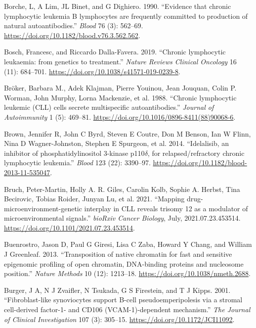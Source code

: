 \documentclass[11pt, a4paper, twosided]{book}
\newenvironment{CSLReferences}%
  {}%
  {\par}
\begin{document}
\begin{CSLReferences}{1}{0}
\leavevmode{}%
Borche, L, A Lim, JL Binet, and G Dighiero. 1990. {``{Evidence that chronic lymphocytic leukemia B lymphocytes are frequently committed to production of natural autoantibodies}.''} \emph{Blood} 76 (3): 562--69. \url{https://doi.org/10.1182/blood.v76.3.562.562}.

\leavevmode{}%
Bosch, Francesc, and Riccardo Dalla-Favera. 2019. {``{Chronic lymphocytic leukaemia: from genetics to treatment}.''} \emph{Nature Reviews Clinical Oncology} 16 (11): 684--701. \url{https://doi.org/10.1038/s41571-019-0239-8}.

\leavevmode{}%
Bröker, Barbara M., Adek Klajman, Pierre Youinou, Jean Jouquan, Colin P. Worman, John Murphy, Lorna Mackenzie, et al. 1988. {``{Chronic lymphocytic leukemic (CLL) cells secrete multispecific autoantibodies}.''} \emph{Journal of Autoimmunity} 1 (5): 469--81. \url{https://doi.org/10.1016/0896-8411(88)90068-6}.

\leavevmode{}%
Brown, Jennifer R, John C Byrd, Steven E Coutre, Don M Benson, Ian W Flinn, Nina D Wagner-Johnston, Stephen E Spurgeon, et al. 2014. {``{Idelalisib, an inhibitor of phosphatidylinositol 3-kinase p110\(\delta\), for relapsed/refractory chronic lymphocytic leukemia}.''} \emph{Blood} 123 (22): 3390--97. \url{https://doi.org/10.1182/blood-2013-11-535047}.

\leavevmode{}%
Bruch, Peter-Martin, Holly A. R. Giles, Carolin Kolb, Sophie A. Herbst, Tina Becirovic, Tobias Roider, Junyan Lu, et al. 2021. {``{Mapping drug-microenvironment-genetic interplay in CLL reveals trisomy 12 as a modulator of microenvironmental signals}.''} \emph{bioRxiv Cancer Biology}, July, 2021.07.23.453514. \url{https://doi.org/10.1101/2021.07.23.453514}.

\leavevmode{}%
Buenrostro, Jason D, Paul G Giresi, Lisa C Zaba, Howard Y Chang, and William J Greenleaf. 2013. {``{Transposition of native chromatin for fast and sensitive epigenomic profiling of open chromatin, DNA-binding proteins and nucleosome position}.''} \emph{Nature Methods} 10 (12): 1213--18. \url{https://doi.org/10.1038/nmeth.2688}.

\leavevmode{}%
Burger, J A, N J Zvaifler, N Tsukada, G S Firestein, and T J Kipps. 2001. {``{Fibroblast-like synoviocytes support B-cell pseudoemperipolesis via a stromal cell-derived factor-1- and CD106 (VCAM-1)-dependent mechanism.}''} \emph{The Journal of Clinical Investigation} 107 (3): 305--15. \url{https://doi.org/10.1172/JCI11092}.


\end{CSLReferences}
\end{document}
